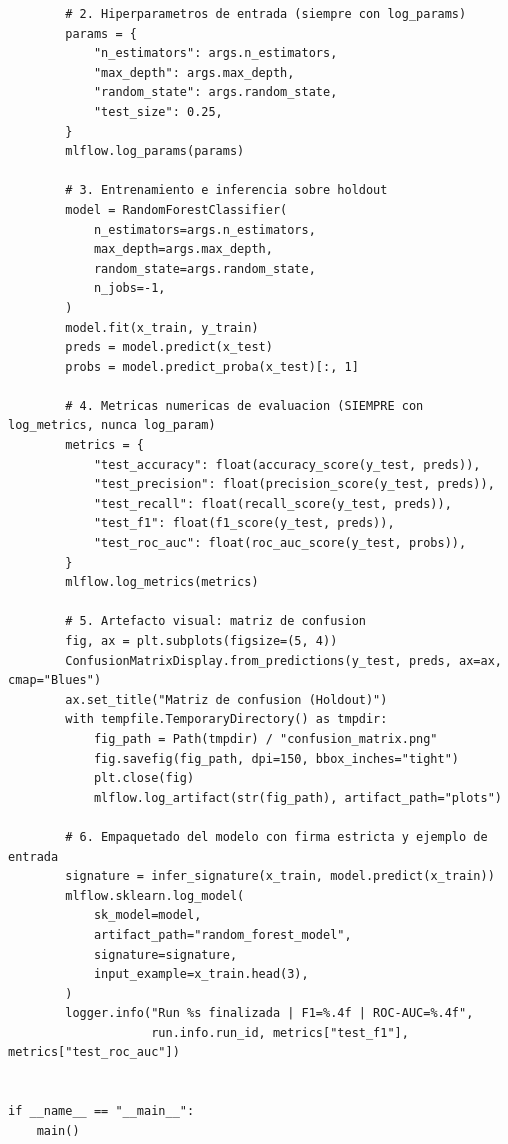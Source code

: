 \begin{lstlisting}
        # 2. Hiperparametros de entrada (siempre con log_params)
        params = {
            "n_estimators": args.n_estimators,
            "max_depth": args.max_depth,
            "random_state": args.random_state,
            "test_size": 0.25,
        }
        mlflow.log_params(params)

        # 3. Entrenamiento e inferencia sobre holdout
        model = RandomForestClassifier(
            n_estimators=args.n_estimators,
            max_depth=args.max_depth,
            random_state=args.random_state,
            n_jobs=-1,
        )
        model.fit(x_train, y_train)
        preds = model.predict(x_test)
        probs = model.predict_proba(x_test)[:, 1]

        # 4. Metricas numericas de evaluacion (SIEMPRE con log_metrics, nunca log_param)
        metrics = {
            "test_accuracy": float(accuracy_score(y_test, preds)),
            "test_precision": float(precision_score(y_test, preds)),
            "test_recall": float(recall_score(y_test, preds)),
            "test_f1": float(f1_score(y_test, preds)),
            "test_roc_auc": float(roc_auc_score(y_test, probs)),
        }
        mlflow.log_metrics(metrics)

        # 5. Artefacto visual: matriz de confusion
        fig, ax = plt.subplots(figsize=(5, 4))
        ConfusionMatrixDisplay.from_predictions(y_test, preds, ax=ax, cmap="Blues")
        ax.set_title("Matriz de confusion (Holdout)")
        with tempfile.TemporaryDirectory() as tmpdir:
            fig_path = Path(tmpdir) / "confusion_matrix.png"
            fig.savefig(fig_path, dpi=150, bbox_inches="tight")
            plt.close(fig)
            mlflow.log_artifact(str(fig_path), artifact_path="plots")

        # 6. Empaquetado del modelo con firma estricta y ejemplo de entrada
        signature = infer_signature(x_train, model.predict(x_train))
        mlflow.sklearn.log_model(
            sk_model=model,
            artifact_path="random_forest_model",
            signature=signature,
            input_example=x_train.head(3),
        )
        logger.info("Run %s finalizada | F1=%.4f | ROC-AUC=%.4f",
                    run.info.run_id, metrics["test_f1"], metrics["test_roc_auc"])


if __name__ == "__main__":
    main()
\end{lstlisting}

